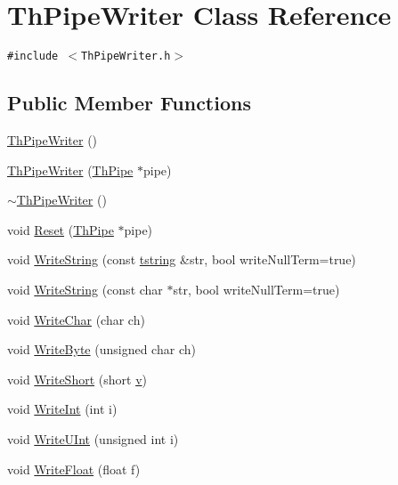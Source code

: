\hypertarget{class_th_pipe_writer}{
\section{ThPipeWriter Class Reference}
\label{class_th_pipe_writer}
}
{\tt \#include $<$ThPipeWriter.h$>$}

\subsection*{Public Member Functions}
\begin{CompactItemize}
\item 
\hyperlink{class_th_pipe_writer_625c375f059493e23431af41145fda05}{ThPipeWriter} ()
\item 
\hyperlink{class_th_pipe_writer_b7958e63e01c34ac4721547113b7fe52}{ThPipeWriter} (\hyperlink{class_th_pipe}{ThPipe} $\ast$pipe)
\item 
\hyperlink{class_th_pipe_writer_7126b2eac1d1e8c627326093146ad39e}{$\sim$ThPipeWriter} ()
\item 
void \hyperlink{class_th_pipe_writer_60ae27a251766f4d8dd2ee881e3671ef}{Reset} (\hyperlink{class_th_pipe}{ThPipe} $\ast$pipe)
\item 
void \hyperlink{class_th_pipe_writer_8051b8a2b7f9482c97bdfed67103ed30}{WriteString} (const \hyperlink{common__afx_8h_816fa58fd77499b0edb2c69ebe803d5c}{tstring} \&str, bool writeNullTerm=true)
\item 
void \hyperlink{class_th_pipe_writer_4b3772d0c7fa0f06add7ea34f80c6aaa}{WriteString} (const char $\ast$str, bool writeNullTerm=true)
\item 
void \hyperlink{class_th_pipe_writer_7b7180984049c3dcb29db2342eda82a2}{WriteChar} (char ch)
\item 
void \hyperlink{class_th_pipe_writer_51cf562b851763177d3d9ee26ce50245}{WriteByte} (unsigned char ch)
\item 
void \hyperlink{class_th_pipe_writer_aa8a14daeae216278150cca3e0ff505d}{WriteShort} (short \hyperlink{glext__bak_8h_5cf89b94f7478c0ebc4429b60e7ef93b}{v})
\item 
void \hyperlink{class_th_pipe_writer_911ab6f8669f8c96658f2e539a6f4e84}{WriteInt} (int i)
\item 
void \hyperlink{class_th_pipe_writer_49f904b80a2b51d00d6e9f892d41575e}{WriteUInt} (unsigned int i)
\item 
void \hyperlink{class_th_pipe_writer_f34f1ac09c81ad04f88ce389d2f97056}{WriteFloat} (float f)
\item 

\end{CompactItemize}

